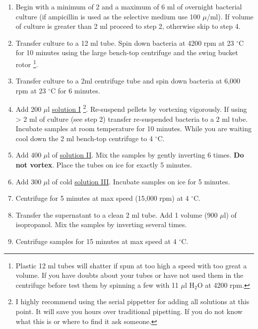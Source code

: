 \documentclass[12pt]{article}
\theoremstyle{definition}
\begin{document}
\begin{enumerate}
	\item Begin with a minimum of 2 and a maximum of 6 ml of overnight bacterial culture (if ampicillin is used as the selective medium use 100 $\mu$/ml). If volume of culture is greater than 2 ml proceed to step 2, otherwise skip to step 4.
	
	\item Transfer culture to a 12 ml tube. Spin down bacteria at 4200 rpm at 23 $^{\circ}$C for 10 minutes using the large bench-top centrifuge and the swing bucket rotor \footnote{Plastic 12 ml tubes will shatter if spun at too high a speed with too great a volume. If you have doubts about your tubes or have not used them in the centrifuge before test them by spinning a few with 11 $\mu$l H$_{2}$O at 4200 rpm.}.
	
	\item Transfer culture to a 2ml centrifuge tube and spin down bacteria at 6,000 rpm at 23 $^{\circ}$C for 6 minutes.
	
	\item Add 200 $\mu$l \hyperref[sec:sol-1]{solution I} \footnote{I highly recommend using the serial pippetter for adding all solutions at this point. It will save you hours over traditional pipetting. If you do not know what this is or where to find it ask someone.}. 
	Re-suspend pellets by vortexing vigorously. If using > 2 ml of culture (see step 2) transfer
	re-suspended bacteria to a 2 ml tube. Incubate samples at room temperature for 10 minutes. While you are waiting cool down the 2 ml bench-top centrifuge to 4  $^{\circ}$C.
	
	\item Add 400 $\mu$l of \hyperref[sec:sol-2]{solution II}. Mix the samples by gently
	inverting 6 times. \textbf{Do not vortex}. Place the tubes on ice for exactly 5 minutes.
	
	\item Add 300 $\mu$l of cold \hyperref[sec:sol-3]{solution III}. Incubate samples on ice for 5 minutes.
	
	\item Centrifuge for 5 minutes at max speed (15,000 rpm) at 4  $^{\circ}$C.
	
	\item Transfer the supernatant to a clean 2 ml tube. Add 1 volume (900 $\mu$l) of isopropanol. Mix the samples by inverting several times.
	
	\item Centrifuge samples for 15 minutes at max speed at 4  $^{\circ}$C.
	

\end{enumerate}
\end{document}
